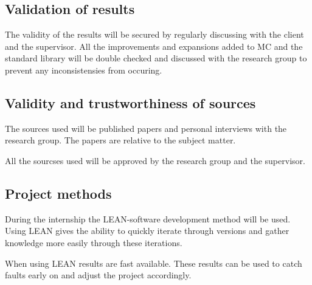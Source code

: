 \subsection{Validation of results}
The validity of the results will be secured by regularly discussing with the client and the supervisor.
All the improvements and expansions added to MC and the standard library will be double checked and discussed with the research group to prevent any inconsistensies from occuring.


\subsection{Validity and trustworthiness of sources}
The sources used will be published papers and personal interviews with the research group.
The papers are relative to the subject matter.

All the sourcses used will be approved by the research group and the supervisor.


\subsection{Project methods}
During the internship the LEAN-software development method will be used\cite{ries2011lean}.
Using LEAN gives the ability to quickly iterate through versions and gather knowledge more easily through these iterations.

When using LEAN results are fast available.
These results can be used to catch faults early on and adjust the project accordingly.


